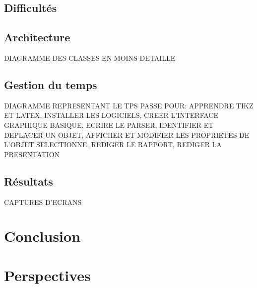 \documentclass[a4paper]{report}
\begin{document}
  \subsection{Difficultés}
  \subsection{Architecture}
  DIAGRAMME DES CLASSES EN MOINS DETAILLE
  \subsection{Gestion du temps}
  DIAGRAMME REPRESENTANT LE TPS PASSE POUR: APPRENDRE TIKZ ET LATEX, INSTALLER LES LOGICIELS, CREER L'INTERFACE GRAPHIQUE BASIQUE, ECRIRE LE PARSER, IDENTIFIER ET DEPLACER UN OBJET, AFFICHER ET MODIFIER LES PROPRIETES DE L'OBJET SELECTIONNE, REDIGER LE RAPPORT, REDIGER LA PRESENTATION
  \subsection{Résultats}
  CAPTURES D'ECRANS
  \section{Conclusion}
  \section{Perspectives}
   
\end{document}
